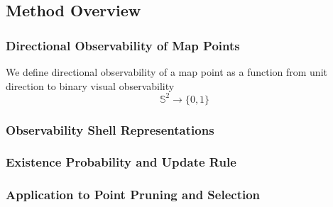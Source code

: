 \subsection{Method Overview}

\subsubsection{Directional Observability of Map Points}


We define directional observability of a map point as a function from unit direction to binary visual observability
$$
    \mathbb{S}^2\rightarrow\{0,1\}
$$



\subsubsection{Observability Shell Representations}

\subsubsection{Existence Probability and Update Rule}

\subsubsection{Application to Point Pruning and Selection}

